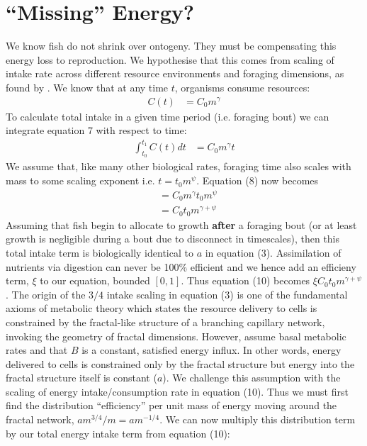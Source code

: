 \documentclass[a4paper]{article} %
\begin{document}
\section{``Missing'' Energy?}
We know fish do not shrink over ontogeny. They must be compensating this energy loss to reproduction. We hypothesise that this comes from scaling of intake rate across different resource environments and foraging dimensions, as found by \cite{Pawar2012}. We know that at any time $t$, organisms consume resources:
\begin{align}
    C(t) &= C_{0}m^{\gamma}
\end{align}
To calculate total intake in a given time period (i.e. foraging bout) we can integrate equation 7 with respect to time:
\begin{align}
    \int_{t_{0}}^{t_{1}}C(t)dt &= C_{0}m^{\gamma}t
\end{align}
We assume that, like many other biological rates, foraging time also scales with mass to some scaling exponent i.e. $t = t_{0}m^{\psi}$. Equation (8) now becomes
\begin{align}
    &= C_{0}m^{\gamma}t_{0}m^{\psi} \\
    &= C_{0}t_{0}m^{\gamma + \psi}
\end{align}
Assuming that fish begin to allocate to growth \textbf{after} a foraging bout (or at least growth is negligible during a bout due to disconnect in timescales), then this total intake term is biologically identical to $a$ in equation (3). Assimilation of nutrients via digestion can never be 100\% efficient and we hence add an efficieny term, $\xi$ to our equation, bounded $[0,1]$. Thus equation (10) becomes $\xi C_{0}t_{0}m^{\gamma + \psi}$. The origin of the $3/4$ intake scaling in equation (3) is one of the fundamental axioms of metabolic theory \autocite{West1997a,West2001} which states the resource delivery to cells is constrained by the fractal-like structure of a branching capillary network, invoking the geometry of fractal dimensions. However, \cite{West2001} assume basal metabolic rates and that $B$ is a constant, satisfied energy influx. In other words, energy delivered to cells is constrained only by the fractal structure but energy into the fractal structure itself is constant ($a$). We challenge this assumption with the scaling of energy intake/consumption rate in equation (10). Thus we must first find the distribution ``efficiency'' per unit mass of energy moving around the fractal network, ${am^{3/4}}/m = am^{-1/4}$. We can now multiply this distribution term by our total energy intake term from equation (10):
\end{document}
